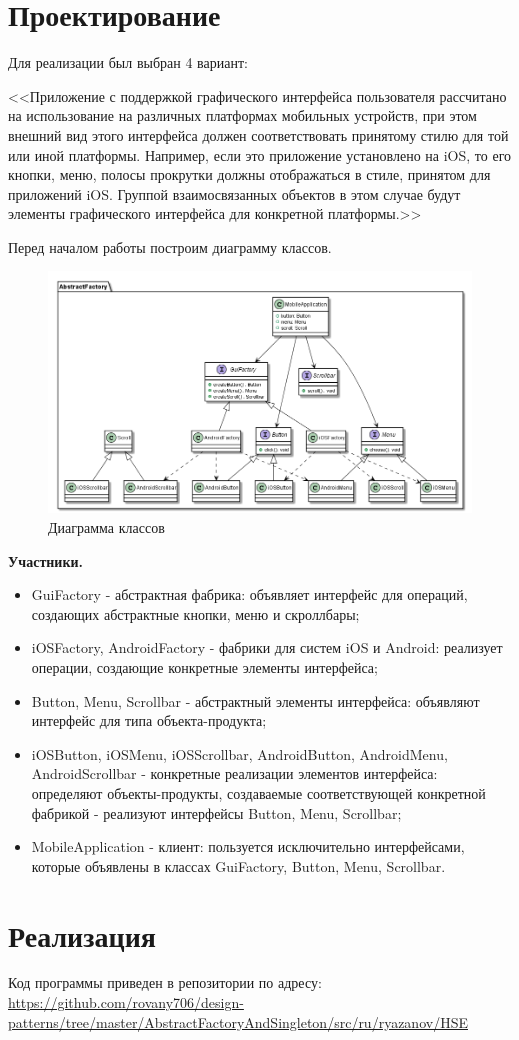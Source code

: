 \documentclass[PI,LAB]{HSEUniversity}
\begin{document}
\section{Проектирование}
Для реализации был выбран 4 вариант: 

<<Приложение с поддержкой графического интерфейса пользователя рассчитано на использование на различных платформах мобильных устройств, при этом внешний вид этого интерфейса должен соответствовать принятому стилю для той или иной платформы. Например, если это приложение установлено на iOS, то его кнопки, меню, полосы прокрутки должны отображаться в стиле, принятом для приложений iOS. Группой взаимосвязанных объектов в этом случае будут элементы графического интерфейса для конкретной платформы.>>

Перед началом работы построим диаграмму классов.
\begin{figure}[h]
  \centering
  \includegraphics[scale=0.5]{Task_CD.png}
  \caption{Диаграмма классов}
\end{figure}

\textbf{Участники.}
\begin{itemize}
  \item GuiFactory - абстрактная фабрика: объявляет интерфейс для операций, создающих абстрактные кнопки, меню и скроллбары;
  \item iOSFactory, AndroidFactory - фабрики для систем iOS и Android: реализует операции, создающие конкретные элементы интерфейса;
  \item Button, Menu, Scrollbar - абстрактный элементы интерфейса: объявляют интерфейс для типа объекта-продукта;
  \item iOSButton, iOSMenu, iOSScrollbar, AndroidButton, AndroidMenu, AndroidScrollbar - конкретные реализации элементов интерфейса: определяют объекты-продукты, создаваемые соответствующей конкретной фабрикой - реализуют интерфейсы Button, Menu, Scrollbar;
  \item MobileApplication - клиент: пользуется исключительно интерфейсами, которые объявлены в классах GuiFactory, Button, Menu, Scrollbar.
\end{itemize}

\section{Реализация}
Код программы приведен в репозитории по адресу: \url{https://github.com/rovany706/design-patterns/tree/master/AbstractFactoryAndSingleton/src/ru/ryazanov/HSE}
\end{document}
